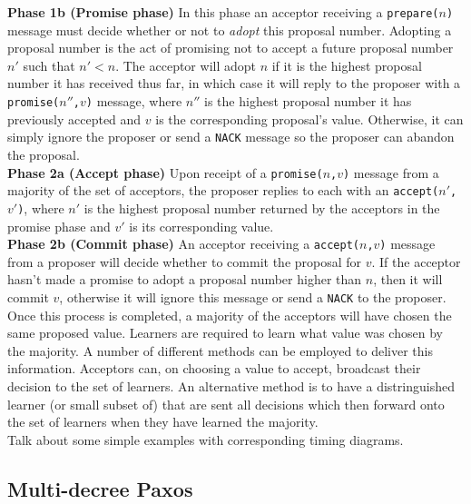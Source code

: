 \textbf{Phase 1b (Promise phase)} In this phase an acceptor receiving a \texttt{prepare($n$)} message must decide whether or not to \emph{adopt} this proposal number. Adopting a proposal number is the act of promising not to accept a future proposal number $n'$ such that $n' < n$. The acceptor will adopt $n$ if it is the highest proposal number it has received thus far, in which case it will reply to the proposer with a \texttt{promise($n''$,$v$)} message, where $n''$ is the highest proposal number it has previously accepted and $v$ is the corresponding proposal's value. Otherwise, it can simply ignore the proposer or send a \texttt{NACK} message so the proposer can abandon the proposal. \\

\textbf{Phase 2a (Accept phase)} Upon receipt of a \texttt{promise($n$,$v$)} message from a majority of the set of acceptors, the proposer replies to each with an \texttt{accept($n'$,$v'$)}, where $n'$ is the highest proposal number returned by the acceptors in the promise phase and $v'$ is its corresponding value. \\

\textbf{Phase 2b (Commit phase)} An acceptor receiving a \texttt{accept($n$,$v$)} message from a proposer will decide whether to commit the proposal for $v$. If the acceptor hasn't made a promise to adopt a proposal number higher than $n$, then it will commit $v$, otherwise it will ignore this message or send a \texttt{NACK} to the proposer. \\

Once this process is completed, a majority of the acceptors will have chosen the same proposed value. Learners are required to learn what value was chosen by the majority. A number of different methods can be employed to deliver this information. Acceptors can, on choosing a value to accept, broadcast their decision to the set of learners. An alternative method is to have a distringuished learner (or small subset of) that are sent all decisions which then forward onto the set of learners when they have learned the majority. \\

{\color{blue}Talk about some simple examples with corresponding timing diagrams.}




\subsection{Multi-decree Paxos}
\label{subsection:multi-decree-paxos}

